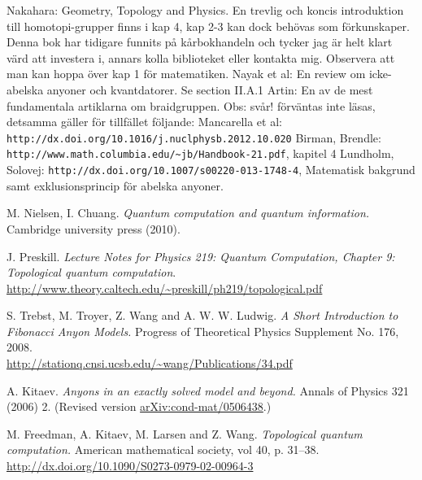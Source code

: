 \documentclass[a4paper,10pt,oneside]{book}
\theoremstyle{plain}
\theoremstyle{definition}
\theoremstyle{remark}
\begin{document}
\begin{thebibliography}{99}
   Nakahara: Geometry, Topology and Physics. En trevlig och koncis introduktion till homotopi-grupper finns i kap 4, kap 2-3 kan dock behövas som förkunskaper. Denna bok har tidigare funnits på kårbokhandeln och tycker jag är helt klart värd att investera i, annars kolla biblioteket eller kontakta mig. Observera att man kan hoppa över kap 1 för matematiken.
   Nayak et al: En review om icke-abelska anyoner och kvantdatorer. Se section II.A.1
   Artin: En av de mest fundamentala artiklarna om braidgruppen. Obs: svår! förväntas inte läsas, detsamma gäller för tillfället följande:
   Mancarella et al: \verb|http://dx.doi.org/10.1016/j.nuclphysb.2012.10.020|
   Birman, Brendle: \verb|http://www.math.columbia.edu/~jb/Handbook-21.pdf|, kapitel 4
   Lundholm, Solovej: \verb|http://dx.doi.org/10.1007/s00220-013-1748-4|, Matematisk bakgrund samt exklusionsprincip för abelska anyoner.

    M. Nielsen, I. Chuang.
    \textit{Quantum computation and quantum information.}
    Cambridge university press (2010).

    J. Preskill.
    \textit{Lecture Notes for Physics 219: Quantum Computation, Chapter 9: Topological quantum computation}.
    \\
    \url{http://www.theory.caltech.edu/~preskill/ph219/topological.pdf}

    S. Trebst, M. Troyer, Z. Wang and A. W. W. Ludwig.
    \textit{A Short Introduction to Fibonacci Anyon Models.}
    Progress of Theoretical Physics Supplement No. 176, 2008.
    \\
    \url{http://stationq.cnsi.ucsb.edu/~wang/Publications/34.pdf}

    A. Kitaev.
    \textit{Anyons in an exactly solved model and beyond.}
    Annals of Physics 321 (2006) 2.
    (Revised version \href{https://arxiv.org/abs/cond-mat/0506438}{arXiv:cond-mat/0506438}.)
    \\

    M. Freedman, A. Kitaev, M. Larsen and Z. Wang.
    \textit{Topological quantum computation.}
    American mathematical society, vol 40, p. 31–38.
    \\
    \url{http://dx.doi.org/10.1090/S0273-0979-02-00964-3}


\end{thebibliography}
\end{document}
